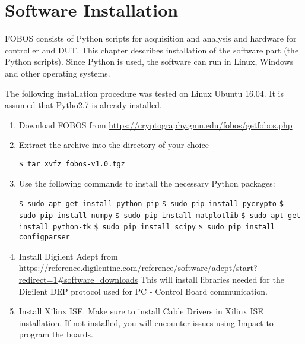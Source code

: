  \chapter{Software Installation}

FOBOS consists of Python scripts for acquisition and analysis and hardware for controller and DUT.
This chapter describes installation of the software part (the Python scripts).
Since Python is used, the software can run in Linux, Windows and other operating systems.

The following installation procedure was tested on Linux Ubuntu 16.04. It is assumed that Pytho2.7 is already installed.
\begin{enumerate}
\item Download FOBOS from \url{https://cryptography.gmu.edu/fobos/getfobos.php}
\item Extract the archive into the directory of your choice

\texttt{\$ tar xvfz fobos-v1.0.tgz }

\item Use the following commands to install the necessary Python packages:

\texttt{\$ sudo apt-get install python-pip} \newline
\texttt{\$ sudo pip install pycrypto} \newline
\texttt{\$ sudo pip install numpy} \newline
\texttt{\$ sudo pip install matplotlib} \newline
\texttt{\$ sudo apt-get install python-tk} \newline
\texttt{\$ sudo pip install scipy} \newline
\texttt{\$ sudo pip install configparser} \newline
\item Install Digilent Adept from
\url{https://reference.digilentinc.com/reference/software/adept/start?redirect=1#software_downloads}
This will install libraries needed for the Digilent DEP protocol used for PC - Control Board communication.
\item Install Xilinx ISE. Make sure to install Cable Drivers in Xilinx ISE installation. If not installed, you will encounter issues using Impact to program the boards.
\end{enumerate}

  